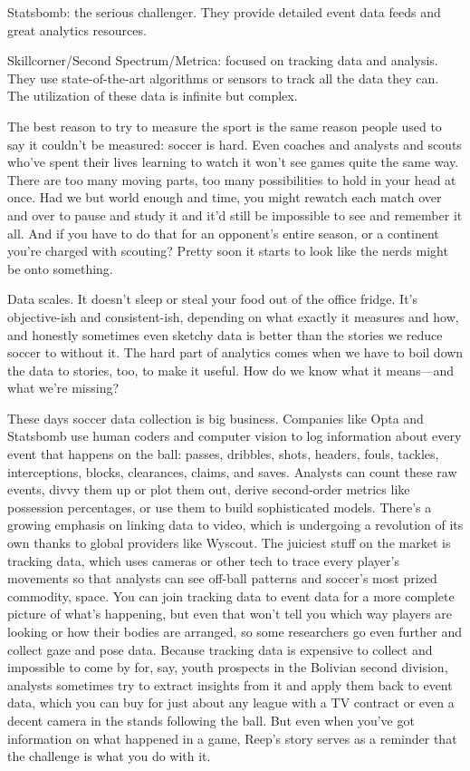 Statsbomb: the serious challenger. They provide detailed event data feeds 
and great analytics resources.

Skillcorner/Second Spectrum/Metrica: focused on tracking data and analysis. 
They use state-of-the-art algorithms or sensors to track all the data they 
can. The utilization of these data is infinite but complex.


The best reason to try to measure the sport is the same reason people 
used to say it couldn’t be measured: soccer is hard. Even coaches and 
analysts and scouts who’ve spent their lives learning to watch it won’t 
see games quite the same way. There are too many moving parts, too many 
possibilities to hold in your head at once. Had we but world enough and 
time, you might rewatch each match over and over to pause and study it 
and it’d still be impossible to see and remember it all. And if you have 
to do that for an opponent’s entire season, or a continent you’re charged 
with scouting? Pretty soon it starts to look like the nerds might be onto 
something.

Data scales. It doesn’t sleep or steal your food out of the office fridge. 
It’s objective-ish and consistent-ish, depending on what exactly it measures 
and how, and honestly sometimes even sketchy data is better than the stories 
we reduce soccer to without it. The hard part of analytics comes when 
we have to boil down the data to stories, too, to make it useful. How do 
we know what it means—and what we’re missing?

These days soccer data collection is big business. Companies like Opta and 
Statsbomb use human coders and computer vision to log information about 
every event that happens on the ball: passes, dribbles, shots, headers, 
fouls, tackles, interceptions, blocks, clearances, claims, and saves. 
Analysts can count these raw events, divvy them up or plot them out, 
derive second-order metrics like possession percentages, or use them 
to build sophisticated models. There’s a growing emphasis on linking 
data to video, which is undergoing a revolution of its own thanks to 
global providers like Wyscout. The juiciest stuff on the market is 
tracking data, which uses cameras or other tech to trace every 
player’s movements so that analysts can see off-ball patterns 
and soccer’s most prized commodity, space. You can join tracking 
data to event data for a more complete picture of what’s happening, 
but even that won’t tell you which way players are looking or how 
their bodies are arranged, so some researchers go even further and 
collect gaze and pose data. Because tracking data is expensive to 
collect and impossible to come by for, say, youth prospects in the 
Bolivian second division, analysts sometimes try to extract insights 
from it and apply them back to event data, which you can buy for just 
about any league with a TV contract or even a decent camera in the 
stands following the ball. But even when you’ve got information on 
what happened in a game, Reep’s story serves as a reminder that 
the challenge is what you do with it.

